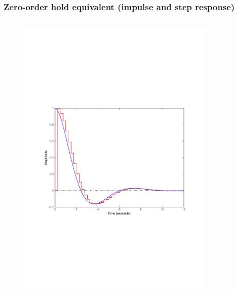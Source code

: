 \begin{frame}
	\frametitle{Zero-order hold equivalent (impulse and step response)}
	\vspace{-0.7em}
	\begin{columns}
		\begin{column}{0.5\textwidth}
		\begin{figure}
			\centering
			\includegraphics[width=1\linewidth]{vb1I}
		\end{figure}
		\end{column}
		\begin{column}{0.5\textwidth}
		\begin{figure}
			\centering

\end{figure}
\end{column}
\end{columns}
\end{frame}
